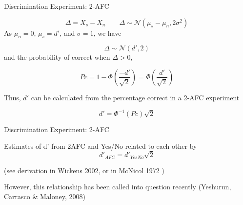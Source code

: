 \documentclass[10pt]{beamer}
\begin{document}
\begin{frame}{Discrimination Experiment: 2-AFC}

$$
\Delta = X_s - X_n \quad \quad \Delta \sim \mathcal{N} (\mu_s - \mu_n, 2\sigma^2)
$$
As $\mu_n=0$, $\mu_s=d'$, and $\sigma=1$, we have

$$
\Delta \sim \mathcal{N} (d', 2)
$$
and the probability of correct  when $\Delta > 0$,

$$Pc = 1 -\Phi\left(\frac{-d'}{\sqrt{2}}\right) = \Phi\left(\frac{d'}{\sqrt{2}} \right)
$$

Thus, $d'$ can be calculated from the percentage correct in a 2-AFC experiment

\begin{equation}
\label{eq:dp_2afc}
d' = \Phi^{-1}(Pc) \sqrt{2}
\end{equation}

\end{frame}

\begin{frame}{Discrimination Experiment: 2-AFC}

Estimates of d' from 2AFC and Yes/No related to each other by 
$$
d'_{AFC} =  d'_{YesNo} \sqrt{2}
$$ 

(see derivation in Wickens 2002,  or in McNicol 1972 )\\
\vspace{30pt}

However, this relationship has been called into question recently (Yeshurun, Carrasco \& Maloney, 2008)
\end{frame}
\end{document}
